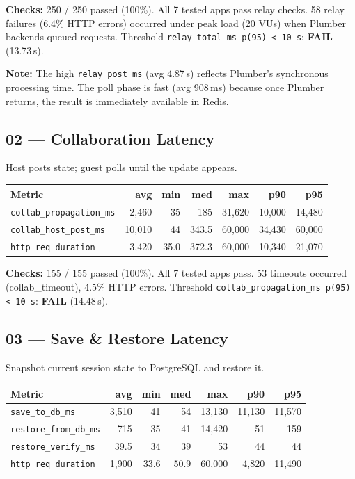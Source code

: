 \documentclass[11pt,a4paper]{article}
\newcommand{\fail}{\textcolor{fail}{\textbf{FAIL}}}
\begin{document}
\medskip
\noindent\textbf{Checks:} 250 / 250 passed (100\%).
All 7 tested apps pass relay checks. 58 relay failures (6.4\% HTTP errors)
occurred under peak load (20 VUs) when Plumber backends queued requests.
Threshold \texttt{relay\_total\_ms p(95) < 10\,s}: \fail{} (13.73\,s).

\noindent\textbf{Note:} The high \texttt{relay\_post\_ms} (avg 4.87\,s) reflects
Plumber's synchronous processing time. The poll phase is fast (avg 908\,ms)
because once Plumber returns, the result is immediately available in Redis.

\subsection{02 — Collaboration Latency}

Host posts state; guest polls until the update appears.

\begin{tabular}{@{}lrrrrrr@{}}
\toprule
\textbf{Metric} & \textbf{avg} & \textbf{min} & \textbf{med} & \textbf{max} & \textbf{p90} & \textbf{p95} \\
\midrule
\texttt{collab\_propagation\_ms} & 2,460  & 35    & 185    & 31,620 & 10,000 & 14,480 \\
\texttt{collab\_host\_post\_ms}  & 10,010 & 44    & 343.5  & 60,000 & 34,430 & 60,000 \\
\texttt{http\_req\_duration}     & 3,420  & 35.0  & 372.3  & 60,000 & 10,340 & 21,070 \\
\bottomrule
\end{tabular}

\medskip
\noindent\textbf{Checks:} 155 / 155 passed (100\%).
All 7 tested apps pass. 53 timeouts occurred (collab\_timeout), 4.5\% HTTP errors.
Threshold \texttt{collab\_propagation\_ms p(95) < 10\,s}: \fail{} (14.48\,s).

\subsection{03 — Save \& Restore Latency}

Snapshot current session state to PostgreSQL and restore it.

\begin{tabular}{@{}lrrrrrr@{}}
\toprule
\textbf{Metric} & \textbf{avg} & \textbf{min} & \textbf{med} & \textbf{max} & \textbf{p90} & \textbf{p95} \\
\midrule
\texttt{save\_to\_db\_ms}       & 3,510  & 41   & 54    & 13,130 & 11,130 & 11,570 \\
\texttt{restore\_from\_db\_ms}  & 715    & 35   & 41    & 14,420 & 51     & 159    \\
\texttt{restore\_verify\_ms}    & 39.5   & 34   & 39    & 53     & 44     & 44     \\
\texttt{http\_req\_duration}    & 1,900  & 33.6 & 50.9  & 60,000 & 4,820  & 11,490 \\
\bottomrule
\end{tabular}
\end{document}
